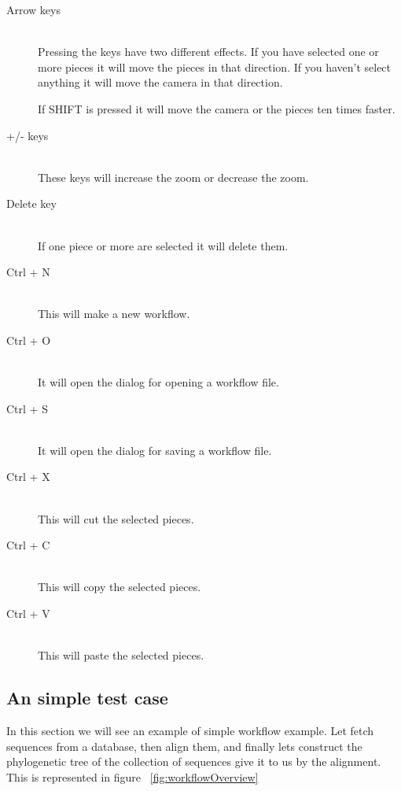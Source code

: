 \documentclass[a4paper,10pt]{article}
\begin{document}
    \begin{description}
    \item[Arrow keys] \hfill \\
    Pressing the keys have two different effects. If you have selected one or more pieces it will move the pieces in that direction. If you haven't select anything it will move the camera in that direction.\vspace{3 mm}

    If SHIFT is pressed it will move the camera or the pieces ten times faster.

    \item[+/- keys] \hfill \\
    These keys will increase the zoom or decrease the zoom.

    \item[Delete key] \hfill \\
    If one piece or more are selected it will delete them.

    \item[Ctrl + N] \hfill \\
    This will make a new workflow.

    \item[Ctrl + O] \hfill \\
    It will open the dialog for opening a workflow file.

    \item[Ctrl + S] \hfill \\
    It will open the dialog for saving a workflow file.

    \item[Ctrl + X] \hfill \\
    This will cut the selected pieces.

    \item[Ctrl + C] \hfill \\
    This will copy the selected pieces.

    \item[Ctrl + V] \hfill \\
    This will paste the selected pieces.
    \end{description}

  \subsection{An simple test case}

  In this section we will see an example of simple workflow example. Let fetch sequences from a database, then align them, and finally lets construct the phylogenetic tree of the collection of sequences give it to us by the alignment. This is represented in figure ~\ref{fig:workflowOverview}\vspace{3 mm}
\end{document}
